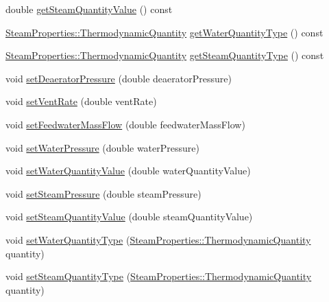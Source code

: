 \begin{DoxyCompactItemize}
double \hyperlink{class_deaerator_a5473feedca64e7c44143d422ed3e2401}{get\+Steam\+Quantity\+Value} () const
\item 
\hyperlink{class_steam_properties_ae0294bedf7d178c2d8fb6aed0f62fbff}{Steam\+Properties\+::\+Thermodynamic\+Quantity} \hyperlink{class_deaerator_a414282f81906e09a28bc75cf51659ec2}{get\+Water\+Quantity\+Type} () const
\item 
\hyperlink{class_steam_properties_ae0294bedf7d178c2d8fb6aed0f62fbff}{Steam\+Properties\+::\+Thermodynamic\+Quantity} \hyperlink{class_deaerator_a18abbdc5ec78f71e1d2495b0c64c77ec}{get\+Steam\+Quantity\+Type} () const
\item 
void \hyperlink{class_deaerator_a5b20d3aba98b21928cce70b45e843ff3}{set\+Deaerator\+Pressure} (double deaerator\+Pressure)
\item 
void \hyperlink{class_deaerator_a11e71194f58763a57ec0f7d05a21782d}{set\+Vent\+Rate} (double vent\+Rate)
\item 
void \hyperlink{class_deaerator_ada95cb2557bc43602d7bcefbad66c853}{set\+Feedwater\+Mass\+Flow} (double feedwater\+Mass\+Flow)
\item 
void \hyperlink{class_deaerator_ae23f64c6983daed388a73c033a15e176}{set\+Water\+Pressure} (double water\+Pressure)
\item 
void \hyperlink{class_deaerator_ac31cf2deb8bf30ee6921d1d9f8281eb8}{set\+Water\+Quantity\+Value} (double water\+Quantity\+Value)
\item 
void \hyperlink{class_deaerator_a5936221e68b5ba3245f0adabed74e6d7}{set\+Steam\+Pressure} (double steam\+Pressure)
\item 
void \hyperlink{class_deaerator_a101399a8b66c3ff1fecf884fd1b1373d}{set\+Steam\+Quantity\+Value} (double steam\+Quantity\+Value)
\item 
void \hyperlink{class_deaerator_ac60ad3d6650ed6c7783d18833bb7e3dd}{set\+Water\+Quantity\+Type} (\hyperlink{class_steam_properties_ae0294bedf7d178c2d8fb6aed0f62fbff}{Steam\+Properties\+::\+Thermodynamic\+Quantity} quantity)
\item 
void \hyperlink{class_deaerator_a1aa3b3de064d148479af9576e717b6c2}{set\+Steam\+Quantity\+Type} (\hyperlink{class_steam_properties_ae0294bedf7d178c2d8fb6aed0f62fbff}{Steam\+Properties\+::\+Thermodynamic\+Quantity} quantity)
\end{DoxyCompactItemize}
